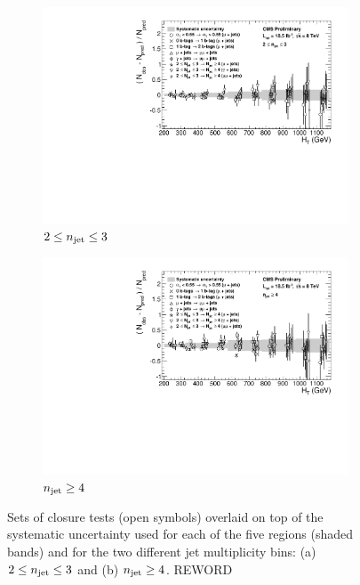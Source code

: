\begin{figure}[ht!]
  \centering
  \begin{subfigure}[b]{0.7\textwidth}
    \includegraphics[width=\textwidth]{Figs/syst/v0/le3j/summary_plot}
    \caption{$2 \leq n_{\text{jet}} \leq 3$}
    \label{fig:closure_summary_le3j}
  \end{subfigure}             
  \begin{subfigure}[b]{0.7\textwidth}
    \includegraphics[width=\textwidth]{Figs/syst/v0/ge4j/summary_plot}
    \caption{$n_{\text{jet}} \geq 4$}
    \label{fig:closure_summary_ge4j}
  \end{subfigure}             
  \caption{Sets of closure tests (open symbols) overlaid on top of
      the systematic uncertainty used for each of the five \HT
      regions (shaded bands) and for the two different jet
      multiplicity bins: (a) $2 \leq n_{\text{jet}} \leq 3$ and (b) $n_{\text{jet}} \geq
      4$. REWORD}
  \label{fig:closure_summary}
\end{figure}

